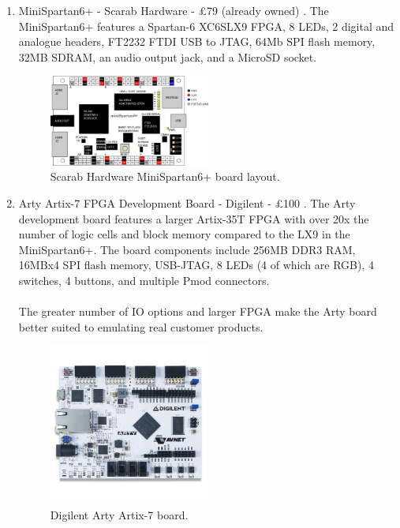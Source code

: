 \documentclass[11pt,a4paper]{report}
\begin{document}
\begin{enumerate}
\item{MiniSpartan6+ - Scarab Hardware - £79 (already owned) \cite{scarabhardware}. The MiniSpartan6+ features a Spartan-6 XC6SLX9 FPGA, 8 LEDs, 2 digital and analogue headers, FT2232 FTDI USB to JTAG, 64Mb SPI flash memory, 32MB SDRAM, an audio output jack, and a MicroSD socket.

\begin{figure}[ht]
\centering
     \includegraphics[width=0.5\textwidth]{minispartan}
      \caption{Scarab Hardware MiniSpartan6+ board layout.}
       \label{fig:res:minispartan}
\end{figure}
}

\item{Arty Artix-7 FPGA Development Board - Digilent - £100 \cite{arty}. The Arty development board features a larger Artix-35T FPGA with over 20x the number of logic cells and block memory compared to the LX9 in the MiniSpartan6+. The board components include 256MB DDR3 RAM, 16MBx4 SPI flash memory, USB-JTAG, 8 LEDs (4 of which are RGB), 4 switches, 4 buttons, and multiple Pmod connectors.
\\\\
The greater number of IO options and larger FPGA make the Arty board better suited to emulating real customer products.


\begin{figure}[ht]
\centering
     \includegraphics[width=0.5\textwidth]{arty}
      \caption{Digilent Arty Artix-7 board.}
       \label{fig:res:arty}
\end{figure}
}
\end{enumerate}
\end{document}
